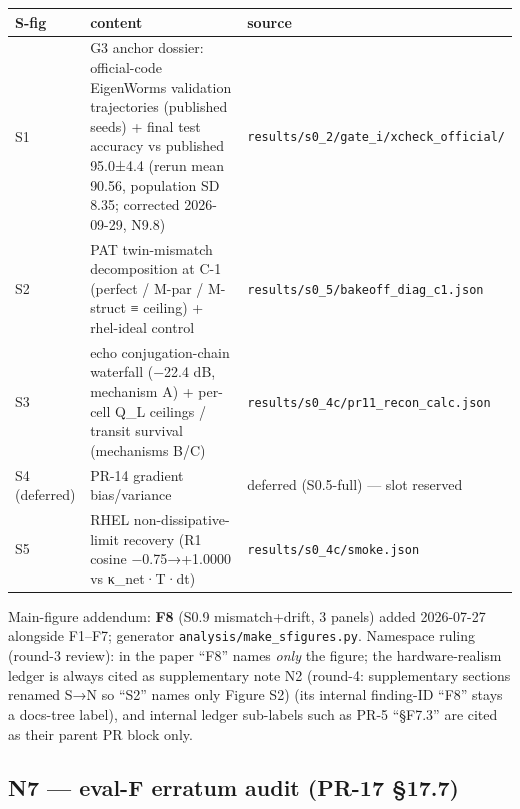 \documentclass[
  10pt,
]{article}
\newcounter{none} %
\begin{document}
{\def\LTcaptype{none} %
\begin{longtable}[]{@{}
  >{\raggedright\arraybackslash}p{}
  >{\raggedright\arraybackslash}p{}
  >{\raggedright\arraybackslash}p{}@{}}
\toprule\noalign{}
\begin{minipage}[b]{\linewidth}\raggedright
S-fig
\end{minipage} & \begin{minipage}[b]{\linewidth}\raggedright
content
\end{minipage} & \begin{minipage}[b]{\linewidth}\raggedright
source
\end{minipage} \\
\midrule\noalign{}
\endhead
\bottomrule\noalign{}
\endlastfoot
S1 & G3 anchor dossier: official-code EigenWorms validation trajectories
(published seeds) + final test accuracy vs published 95.0±4.4 (rerun
mean 90.56, population SD 8.35; corrected 2026-09-29, N9.8) &
\texttt{results/s0\_2/gate\_i/xcheck\_official/} \\
S2 & PAT twin-mismatch decomposition at C-1 (perfect / M-par / M-struct
≡ ceiling) + rhel-ideal control &
\texttt{results/s0\_5/bakeoff\_diag\_c1.json} \\
S3 & echo conjugation-chain waterfall (−22.4 dB, mechanism A) + per-cell
Q\_L ceilings / transit survival (mechanisms B/C) &
\texttt{results/s0\_4c/pr11\_recon\_calc.json} \\
S4 (deferred) & PR-14 gradient bias/variance & deferred (S0.5-full) ---
slot reserved \\
S5 & RHEL non-dissipative-limit recovery (R1 cosine −0.75→+1.0000 vs
κ\_net·T·dt) & \texttt{results/s0\_4c/smoke.json} \\
\end{longtable}
}

Main-figure addendum: \textbf{F8} (S0.9 mismatch+drift, 3 panels) added
2026-07-27 alongside F1--F7; generator
\texttt{analysis/make\_sfigures.py}. Namespace ruling (round-3 review):
in the paper ``F8'' names \emph{only} the figure; the hardware-realism
ledger is always cited as supplementary note N2 (round-4: supplementary
sections renamed S→N so ``S2'' names only Figure S2) (its internal
finding-ID ``F8'' stays a docs-tree label), and internal ledger
sub-labels such as PR-5 ``§F7.3'' are cited as their parent PR block
only.

\subsection{N7 --- eval-F erratum audit (PR-17
§17.7)}\label{n7-eval-f-erratum-audit-pr-17-17.7}
\end{document}
